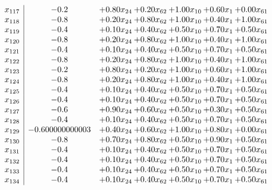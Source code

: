 \documentclass[8pt]{article}
\begin{document}
\[\begin{array}{c| c c@{\hskip 2pt} c@{\hskip 2pt} c@{\hskip 2pt} c@{\hskip 2pt} c@{\hskip 2pt} }
 x_{117}   &  -0.2 & +  0.80 x_{24} & +  0.20 x_{62} & +  1.00 x_{10} & +  0.60 x_{1} & +  0.00 x_{61}\\
 x_{118}   &  -0.8 & +  0.20 x_{24} & +  0.80 x_{62} & +  1.00 x_{10} & +  0.40 x_{1} & +  1.00 x_{61}\\
 x_{119}   &  -0.4 & +  0.10 x_{24} & +  0.40 x_{62} & +  0.50 x_{10} & +  0.70 x_{1} & +  0.50 x_{61}\\
 x_{120}   &  -0.8 & +  0.20 x_{24} & +  0.80 x_{62} & +  1.00 x_{10} & +  0.40 x_{1} & +  1.00 x_{61}\\
 x_{121}   &  -0.4 & +  0.10 x_{24} & +  0.40 x_{62} & +  0.50 x_{10} & +  0.70 x_{1} & +  0.50 x_{61}\\
 x_{122}   &  -0.8 & +  0.20 x_{24} & +  0.80 x_{62} & +  1.00 x_{10} & +  0.40 x_{1} & +  1.00 x_{61}\\
 x_{123}   &  -0.2 & +  0.80 x_{24} & +  0.20 x_{62} & +  1.00 x_{10} & +  0.60 x_{1} & +  1.00 x_{61}\\
 x_{124}   &  -0.8 & +  0.20 x_{24} & +  0.80 x_{62} & +  1.00 x_{10} & +  0.40 x_{1} & +  1.00 x_{61}\\
 x_{125}   &  -0.4 & +  0.10 x_{24} & +  0.40 x_{62} & +  0.50 x_{10} & +  0.70 x_{1} & +  0.50 x_{61}\\
 x_{126}   &  -0.4 & +  0.10 x_{24} & +  0.40 x_{62} & +  0.50 x_{10} & +  0.70 x_{1} & +  0.50 x_{61}\\
 x_{127}   &  -0.6 & +  0.90 x_{24} & +  0.60 x_{62} & +  0.50 x_{10} & +  0.30 x_{1} & +  0.50 x_{61}\\
 x_{128}   &  -0.4 & +  0.10 x_{24} & +  0.40 x_{62} & +  0.50 x_{10} & +  0.70 x_{1} & +  0.50 x_{61}\\
 x_{129}   &  -0.600000000003 & +  0.40 x_{24} & +  0.60 x_{62} & +  1.00 x_{10} & +  0.80 x_{1} & +  0.00 x_{61}\\
 x_{130}   &  -0.8 & +  0.70 x_{24} & +  0.80 x_{62} & +  0.50 x_{10} & +  0.90 x_{1} & +  0.50 x_{61}\\
 x_{131}   &  -0.4 & +  0.10 x_{24} & +  0.40 x_{62} & +  0.50 x_{10} & +  0.70 x_{1} & +  0.50 x_{61}\\
 x_{132}   &  -0.4 & +  0.10 x_{24} & +  0.40 x_{62} & +  0.50 x_{10} & +  0.70 x_{1} & +  0.50 x_{61}\\
 x_{133}   &  -0.4 & +  0.10 x_{24} & +  0.40 x_{62} & +  0.50 x_{10} & +  0.70 x_{1} & +  0.50 x_{61}\\
 x_{134}   &  -0.4 & +  0.10 x_{24} & +  0.40 x_{62} & +  0.50 x_{10} & +  0.70 x_{1} & +  0.50 x_{61}\\

\end{array}\]
\end{document}

